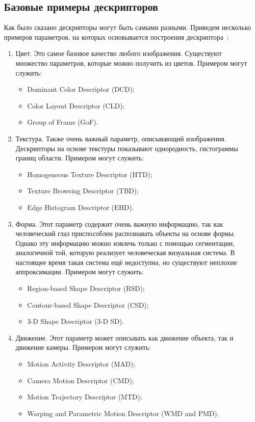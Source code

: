 \subsection{Базовые примеры дескрипторов}

Как было сказано дескрипторы могут быть самыми разными. Приведем несколько примеров параметров, на которых основывается построения дескриптора~\cite{wiki2017descriptor}:
\begin{enumerate}
	\item Цвет. Это самое базовое качество любого изображения. Существуют множество параметров, которые можно получить из цветов. Примером могут служить:
	\begin{itemize}
		\item Dominant Color Descriptor (DCD);
		\item Color Layout Descriptor (CLD);
		\item Group of Frame (GoF).
	\end{itemize}
	\item Текстура. Также очень важный параметр, описывающий изображения. Дескрипторы на основе текстуры показывают однородность, гистограммы границ области. Примером могут служить:
	\begin{itemize}
		\item Homogeneous Texture Descriptor (HTD);
		\item Texture Browsing Descriptor (TBD);
		\item Edge Histogram Descriptor (EHD).
	\end{itemize}
	\item Форма. Этот параметр содержит очень важную информацию, так как человеческий глаз приспособлен распознавать объекты на основе формы. Однако эту информацию можно извлечь только с помощью сегментации, аналогичной той, которую реализует человеческая визуальная система. В настоящее время такая система ещё недоступна, но существуют неплохие аппроксимации. Примером могут служить:
	\begin{itemize}
		\item Region-based Shape Descriptor (RSD);
		\item Contour-based Shape Descriptor (CSD);
		\item 3-D Shape Descriptor (3-D SD).
	\end{itemize}
	\item Движение. Этот параметр может описывать как движение объекта, так и движение камеры. Примером могут служить:
	\begin{itemize}
		\item Motion Activity Descriptor (MAD);
		\item Camera Motion Descriptor (CMD);
		\item Motion Trajectory Descriptor (MTD);
		\item Warping and Parametric Motion Descriptor (WMD and PMD).
	\end{itemize}
\end{enumerate}

